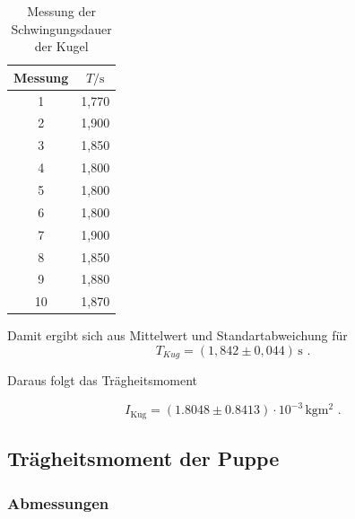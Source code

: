 \begin{table}[H]
  \centering
  \caption{Messung der Schwingungsdauer der Kugel}
  \label{tab:SchwingungsdauerKugel}
  \begin{tabular}{c c}
    \toprule
    Messung &  $T / \unit\second$ \\
    \midrule
              1 &        1,770 \\
              2 &        1,900 \\
              3 &        1,850 \\
              4 &        1,800 \\
              5 &        1,800 \\
              6 &        1,800 \\
              7 &        1,900 \\
              8 &        1,850 \\
              9 &        1,880 \\
             10 &        1,870 \\
    \bottomrule
    \end{tabular}
\end{table}

Damit ergibt sich aus Mittelwert und Standartabweichung für
\begin{equation*}
  T_{Kug} = (1,842 \pm 0,044) \, \unit\second \text{ .}
\end{equation*}

Daraus folgt das Trägheitsmoment

\begin{equation*}
  I_{\text{Kug}} = (1.8048 \pm 0.8413) \cdot 10^{-3} \, \unit{\kilo\gram\meter\squared} \text{ .}
\end{equation*}


\subsection{Trägheitsmoment der Puppe}

\subsubsection{Abmessungen}

